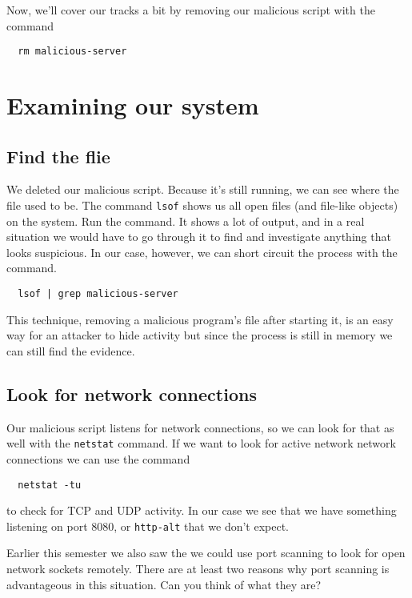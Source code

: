 \documentclass{article}
\begin{document}
Now, we'll cover our tracks a bit by removing our malicious script with the command

\begin{verbatim}
  rm malicious-server
\end{verbatim}

\section{Examining our system}
\subsection{Find the flie}
We deleted our malicious script.  Because it's still running, we can see where the file used to be.  The command \texttt{lsof} shows us all open files (and file-like objects) on the system.  Run the command. It shows a lot of output, and in a real situation we would have to go through it to find and investigate anything that looks suspicious. In our case, however, we can short circuit the process with the command.

\begin{verbatim}
  lsof | grep malicious-server
\end{verbatim}

This technique, removing a malicious program's file after starting it, is an easy way for an attacker to hide activity but since the process is still in memory we can still find the evidence.

\subsection{Look for network connections}
Our malicious script listens for network connections, so we can look for that as well with the \texttt{netstat} command. If we want to look for active network network connections we can use the command

\begin{verbatim}
  netstat -tu
\end{verbatim}

to check for TCP and UDP activity.  In our case we see that we have something listening on port 8080, or \texttt{http-alt} that we don't expect.

Earlier this semester we also saw the we could use port scanning to look for open network sockets remotely.  There are at least two reasons why port scanning is advantageous in this situation.  Can you think of what they are?
\end{document}
